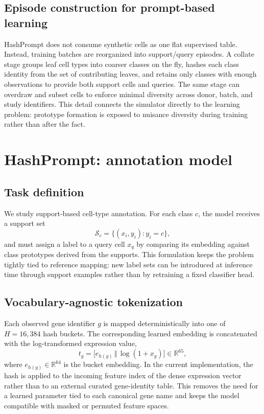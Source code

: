 \documentclass{article}
\begin{document}
\subsection{Episode construction for prompt-based learning}
HashPrompt does not consume synthetic cells as one flat supervised table. Instead, training batches are reorganized into support/query episodes. A collate stage groups leaf cell types into coarser classes on the fly, hashes each class identity from the set of contributing leaves, and retains only classes with enough observations to provide both support cells and queries. The same stage can overdraw and subset cells to enforce minimal diversity across donor, batch, and study identifiers. This detail connects the simulator directly to the learning problem: prototype formation is exposed to nuisance diversity during training rather than after the fact.

\section{HashPrompt: annotation model}

\subsection{Task definition}
We study support-based cell-type annotation. For each class $c$, the model receives a support set
\begin{equation}
    \mathcal{S}_c = \{(x_i, y_i) : y_i = c\},
\end{equation}
and must assign a label to a query cell $x_q$ by comparing its embedding against class prototypes derived from the supports. This formulation keeps the problem tightly tied to reference mapping: new label sets can be introduced at inference time through support examples rather than by retraining a fixed classifier head.

\subsection{Vocabulary-agnostic tokenization}
Each observed gene identifier $g$ is mapped deterministically into one of $H=16{,}384$ hash buckets. The corresponding learned embedding is concatenated with the log-transformed expression value,
\begin{equation}
    t_g = \bigl[e_{h(g)} \,\Vert\, \log(1+x_g)\bigr] \in \mathbb{R}^{65},
\end{equation}
where $e_{h(g)} \in \mathbb{R}^{64}$ is the bucket embedding. In the current implementation, the hash is applied to the incoming feature index of the dense expression vector rather than to an external curated gene-identity table. This removes the need for a learned parameter tied to each canonical gene name and keeps the model compatible with masked or permuted feature spaces.
\end{document}
